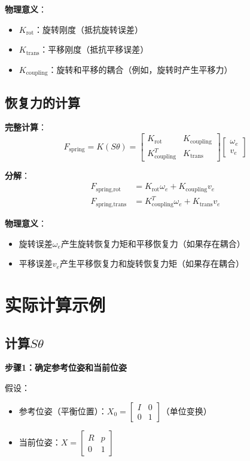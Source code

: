 \documentclass[12pt,a4paper]{article}
\begin{document}
\textbf{物理意义}：
\begin{itemize}
\item $K_{\text{rot}}$：旋转刚度（抵抗旋转误差）
\item $K_{\text{trans}}$：平移刚度（抵抗平移误差）
\item $K_{\text{coupling}}$：旋转和平移的耦合（例如，旋转时产生平移力）
\end{itemize}

\subsection{恢复力的计算}

\textbf{完整计算}：
\begin{equation}
F_{\text{spring}} = K(S\theta) = \begin{bmatrix} K_{\text{rot}} & K_{\text{coupling}} \\ K_{\text{coupling}}^T & K_{\text{trans}} \end{bmatrix} \begin{bmatrix} \omega_e \\ v_e \end{bmatrix}
\end{equation}

\textbf{分解}：
\begin{align}
F_{\text{spring,rot}} &= K_{\text{rot}} \omega_e + K_{\text{coupling}} v_e \\
F_{\text{spring,trans}} &= K_{\text{coupling}}^T \omega_e + K_{\text{trans}} v_e
\end{align}

\textbf{物理意义}：
\begin{itemize}
\item 旋转误差$\omega_e$产生旋转恢复力矩和平移恢复力（如果存在耦合）
\item 平移误差$v_e$产生平移恢复力和旋转恢复力矩（如果存在耦合）
\end{itemize}

\section{实际计算示例}

\subsection{计算$S\theta$}

\textbf{步骤1：确定参考位姿和当前位姿}

假设：
\begin{itemize}
\item 参考位姿（平衡位置）：$X_0 = \begin{bmatrix} I & 0 \\ 0 & 1 \end{bmatrix}$（单位变换）
\item 当前位姿：$X = \begin{bmatrix} R & p \\ 0 & 1 \end{bmatrix}$
\end{itemize}
\end{document}
